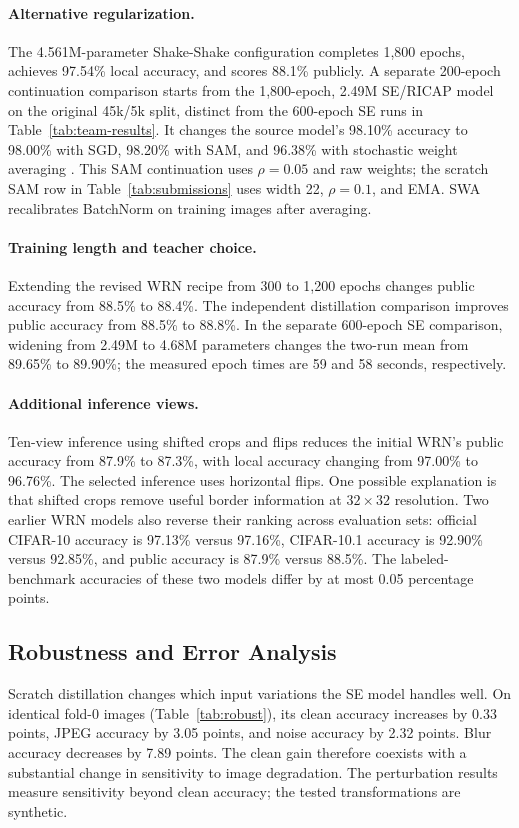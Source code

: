 \documentclass[letterpaper]{article} %
\begin{document}
\paragraph{Alternative regularization.}
The 4.561M-parameter Shake-Shake configuration completes 1,800 epochs, achieves 97.54\% local accuracy, and scores 88.1\% publicly. A separate 200-epoch continuation comparison starts from the 1,800-epoch, 2.49M SE/RICAP model on the original 45k/5k split, distinct from the 600-epoch SE runs in Table~\ref{tab:team-results}. It changes the source model's 98.10\% accuracy to 98.00\% with SGD, 98.20\% with SAM, and 96.38\% with stochastic weight averaging \cite{izmailov2018averaging}. This SAM continuation uses $\rho=0.05$ and raw weights; the scratch SAM row in Table~\ref{tab:submissions} uses width 22, $\rho=0.1$, and EMA. SWA recalibrates BatchNorm on training images after averaging.

\paragraph{Training length and teacher choice.}
Extending the revised WRN recipe from 300 to 1,200 epochs changes public accuracy from 88.5\% to 88.4\%. The independent distillation comparison improves public accuracy from 88.5\% to 88.8\%. In the separate 600-epoch SE comparison, widening from 2.49M to 4.68M parameters changes the two-run mean from 89.65\% to 89.90\%; the measured epoch times are 59 and 58 seconds, respectively.

\paragraph{Additional inference views.}
Ten-view inference using shifted crops and flips reduces the initial WRN's public accuracy from 87.9\% to 87.3\%, with local accuracy changing from 97.00\% to 96.76\%. The selected inference uses horizontal flips. One possible explanation is that shifted crops remove useful border information at $32\times32$ resolution. Two earlier WRN models also reverse their ranking across evaluation sets: official CIFAR-10 accuracy is 97.13\% versus 97.16\%, CIFAR-10.1 accuracy is 92.90\% versus 92.85\%, and public accuracy is 87.9\% versus 88.5\%. The labeled-benchmark accuracies of these two models differ by at most 0.05 percentage points.

\subsection{Robustness and Error Analysis}
Scratch distillation changes which input variations the SE model handles well. On identical fold-0 images (Table~\ref{tab:robust}), its clean accuracy increases by 0.33 points, JPEG accuracy by 3.05 points, and noise accuracy by 2.32 points. Blur accuracy decreases by 7.89 points. The clean gain therefore coexists with a substantial change in sensitivity to image degradation. The perturbation results measure sensitivity beyond clean accuracy; the tested transformations are synthetic.
\end{document}
